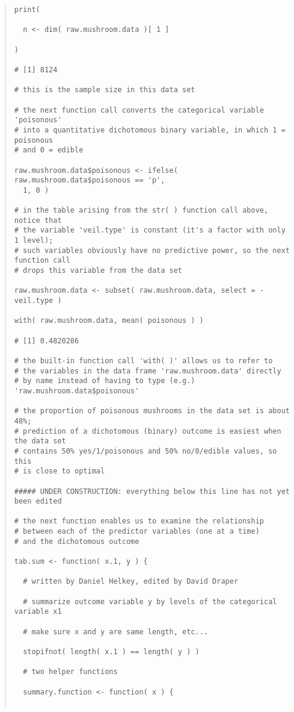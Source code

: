 \documentclass[12pt]{article}
\begin{document}
\begin{quote}
\begin{verbatim}
print( 

  n <- dim( raw.mushroom.data )[ 1 ] 

)

# [1] 8124          

# this is the sample size in this data set

# the next function call converts the categorical variable 'poisonous'
# into a quantitative dichotomous binary variable, in which 1 = poisonous
# and 0 = edible

raw.mushroom.data$poisonous <- ifelse( raw.mushroom.data$poisonous == 'p',
  1, 0 )

# in the table arising from the str( ) function call above, notice that
# the variable 'veil.type' is constant (it's a factor with only 1 level);
# such variables obviously have no predictive power, so the next function call
# drops this variable from the data set 

raw.mushroom.data <- subset( raw.mushroom.data, select = - veil.type )

with( raw.mushroom.data, mean( poisonous ) )

# [1] 0.4820286

# the built-in function call 'with( )' allows us to refer to
# the variables in the data frame 'raw.mushroom.data' directly
# by name instead of having to type (e.g.) 'raw.mushroom.data$poisonous'

# the proportion of poisonous mushrooms in the data set is about 48%;
# prediction of a dichotomous (binary) outcome is easiest when the data set
# contains 50% yes/1/poisonous and 50% no/0/edible values, so this
# is close to optimal

##### UNDER CONSTRUCTION: everything below this line has not yet been edited

# the next function enables us to examine the relationship
# between each of the predictor variables (one at a time)
# and the dichotomous outcome 

tab.sum <- function( x.1, y ) {

  # written by Daniel Helkey, edited by David Draper

  # summarize outcome variable y by levels of the categorical variable x1

  # make sure x and y are same length, etc...

  stopifnot( length( x.1 ) == length( y ) )

  # two helper functions

  summary.function <- function( x ) {


\end{verbatim}
\end{quote}
\end{document}
